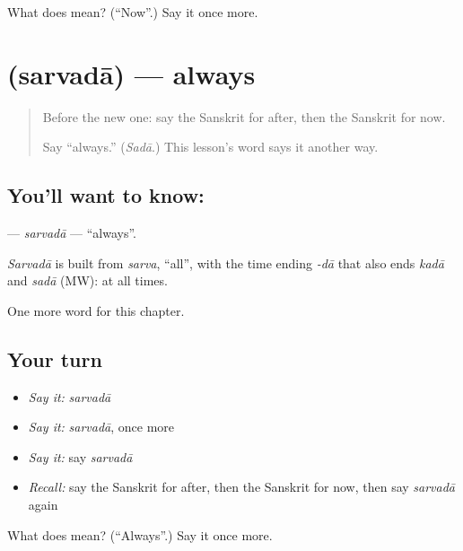 \begin{tcolorbox}[breakable,colback=teal!4,colframe=teal!35!black,title={Before you move on}]
What does  mean? (\textquotedblleft{}Now\textquotedblright{}.) Say it once more.
\end{tcolorbox}
\section[\texorpdfstring{\sk{सर्वदा} (sarvadā)}{सर्वदा (sarvadā)}]{ (sarvadā) — always}

\label{lesson:SA-C92-sarvada}



\begin{quote}
Before the new one: say the Sanskrit for after, then the Sanskrit for now.

Say \textquotedblleft{}always.\textquotedblright{} (\emph{Sadā}.) This lesson's word says it another way.
\end{quote}

\subsection*{You'll want to know: }
\textbf{} — \emph{sarvadā} — \textquotedblleft{}always\textquotedblright{}.

\begin{cousinweb}
\emph{Sarvadā} is built from \emph{sarva}, \textquotedblleft{}all\textquotedblright{}, with the time ending \emph{-dā} that also ends \emph{kadā} and \emph{sadā} (MW): at all times.
\end{cousinweb}

\begin{grammarlens}[title={What you've built}]
One more word for this chapter.
\end{grammarlens}

\subsection*{Your turn}
\begin{itemize}
\raggedright
  \item \emph{Say it:} \emph{sarvadā}
  \item \emph{Say it:} \emph{sarvadā}, once more
  \item \emph{Say it:} say \emph{sarvadā}
  \item \emph{Recall:} say the Sanskrit for after, then the Sanskrit for now, then say \emph{sarvadā} again
\end{itemize}

\begin{tcolorbox}[breakable,colback=teal!4,colframe=teal!35!black,title={Before you move on}]
What does  mean? (\textquotedblleft{}Always\textquotedblright{}.) Say it once more.
\end{tcolorbox}
